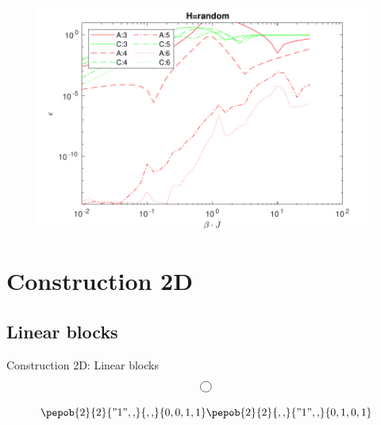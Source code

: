 \documentclass[aspectratio=169]{beamer}
\begin{document}
\begin{frame}
    \begin{figure}
        \includegraphics[scale=0.6]{Figures/rand_01.pdf}
    \end{figure}
\end{frame}


\section{Construction 2D}

\subsection{ Linear blocks}


\begin{frame}{Construction 2D: Linear blocks}
    \begin{equation}
        \mpob{1}{ {,}  }{}{}{}{{,,}}
    \end{equation}

    \begin{equation}
        \pepob{2}{2}{{"1",,}}{{,,}}{{0,0,1,1}}  \pepob{2}{2}{{,,}}{{"1",,}}{{0,1,0,1}}
    \end{equation}



\end{frame}
\end{document}
